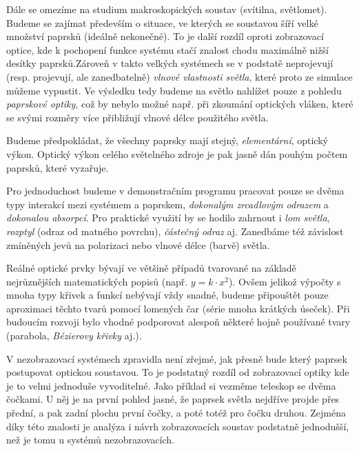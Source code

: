 Dále se omezíme na studium makroskopických soustav (svítilna, světlomet). Budeme se zajímat především o situace, ve kterých se soustavou šíří velké množství paprsků (ideálně nekonečné). To je další rozdíl oproti zobrazovací optice, kde k pochopení funkce systému stačí znalost chodu maximálně nižší desítky paprsků.\src Zároveň v takto velkých systémech se v podstatě neprojevují (resp. projevují, ale zanedbatelně) \emph{vlnové vlastnosti světla}, které proto ze simulace můžeme vypustit. Ve výsledku tedy budeme na světlo nahlížet pouze z pohledu \emph{paprskové optiky}, což by nebylo možné např. při zkoumání optických vláken, které se svými rozměry více přibližují vlnové délce použitého světla.

Budeme předpokládat, že všechny paprsky mají stejný, \emph{elementární}, optický výkon. Optický výkon celého světelného zdroje je pak jasně dán pouhým počtem paprsků, které vyzařuje.

Pro jednoduchost budeme v demonstračním programu pracovat pouze se dvěma typy interakcí mezi systémem a paprskem, \emph{dokonalým zrcadlovým odrazem} a \emph{dokonalou absorpcí}. Pro praktické využití by se hodilo zahrnout i \emph{lom světla}, \emph{rozptyl} (odraz od matného povrchu), \emph{částečný odraz} aj. Zanedbáme též závislost zmíněných jevů na polarizaci nebo vlnové délce (barvě) světla.



Reálné optické prvky bývají ve většině případů tvarované na základě nejrůznějších matematických popisů (např. $y = k \cdot x^2$). Ovšem jelikož výpočty s mnoha typy křivek a funkcí nebývají vždy snadné, budeme připouštět pouze aproximaci těchto tvarů pomocí lomených čar (série mnoha krátkých úseček). Při budoucím rozvoji bylo vhodné podporovat alespoň některé hojně používané tvary (parabola, \emph{Bézierovy křivky} aj.).


V nezobrazovací systémech zpravidla není zřejmé, jak přesně bude který paprsek postupovat optickou soustavou. To je podstatný rozdíl od zobrazovací optiky kde je to velmi jednoduše vyvoditelné. Jako příklad si vezměme teleskop se dvěma čočkami. U něj je na první pohled jasné, že paprsek světla nejdříve projde přes přední, a pak zadní plochu první čočky, a poté totéž pro čočku druhou. Zejména díky této znalosti je analýza i návrh zobrazovacích soustav podstatně jednodušší, než je tomu u systémů nezobrazovacích.
